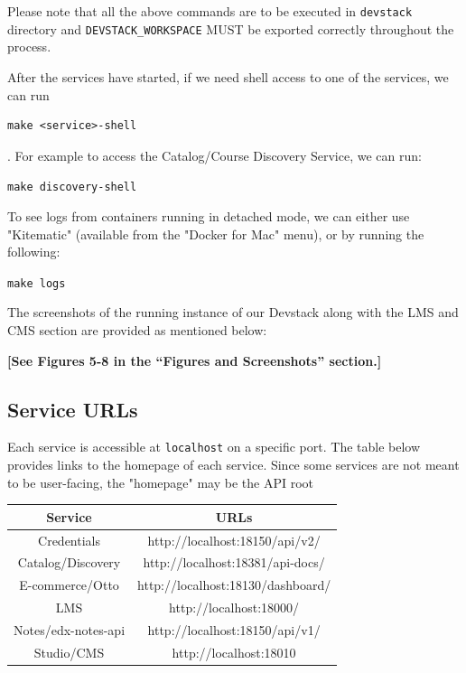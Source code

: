 Please note that all the above commands are to be executed in \verb=devstack= directory and \verb=DEVSTACK_WORKSPACE= MUST be exported correctly throughout the process.

After the services have started, if we need shell access to one of the services, we can run \begin{verbatim}make <service>-shell\end{verbatim}. For example to access the Catalog/Course Discovery Service, we can run:\newline
\begin{center}
\verb=make discovery-shell=
\end{center}
To see logs from containers running in detached mode, we can either use "Kitematic" (available
from the "Docker for Mac" menu), or by running the following:\newline
\begin{center}
\verb=make logs=
\end{center}
The screenshots of the running instance of our Devstack along with the LMS and CMS
section are provided as mentioned below:
\begin{center}
\textbf{[See Figures 5-8 in the “Figures and Screenshots” section.]}
\end{center}

\subsection{Service URLs}
Each service is accessible at \verb=localhost= on a specific port. The table below provides links
to the homepage of each service. Since some services are not meant to be user-facing, the
"homepage" may be the API root
\begin{center}
	\begin{tabular}{ |c|c| }
	\hline
	\textbf{Service} & \textbf{URLs} \\
	\hline
	Credentials & http://localhost:18150/api/v2/ \\
	Catalog/Discovery & http://localhost:18381/api-docs/ \\
	E-commerce/Otto & http://localhost:18130/dashboard/ \\
	LMS & http://localhost:18000/ \\
	Notes/edx-notes-api & http://localhost:18150/api/v1/ \\
	Studio/CMS & http://localhost:18010 \\
	\hline
	\end{tabular}
\end{center}
